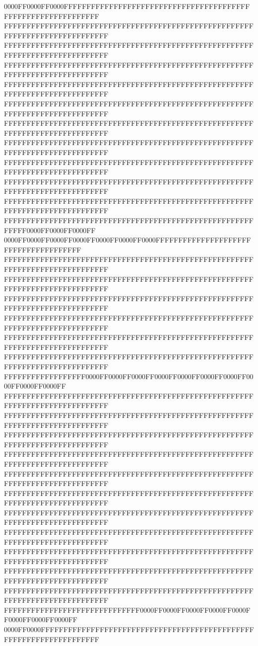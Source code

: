 0000FF0000FF0000FFFFFFFFFFFFFFFFFFFFFFFFFFFFFFFFFFFFFFFFFFFFFFFFFFFFFFFFFFFFFF
FFFFFFFFFFFFFFFFFFFFFFFFFFFFFFFFFFFFFFFFFFFFFFFFFFFFFFFFFFFFFFFFFFFFFFFFFFFFFF
FFFFFFFFFFFFFFFFFFFFFFFFFFFFFFFFFFFFFFFFFFFFFFFFFFFFFFFFFFFFFFFFFFFFFFFFFFFFFF
FFFFFFFFFFFFFFFFFFFFFFFFFFFFFFFFFFFFFFFFFFFFFFFFFFFFFFFFFFFFFFFFFFFFFFFFFFFFFF
FFFFFFFFFFFFFFFFFFFFFFFFFFFFFFFFFFFFFFFFFFFFFFFFFFFFFFFFFFFFFFFFFFFFFFFFFFFFFF
FFFFFFFFFFFFFFFFFFFFFFFFFFFFFFFFFFFFFFFFFFFFFFFFFFFFFFFFFFFFFFFFFFFFFFFFFFFFFF
FFFFFFFFFFFFFFFFFFFFFFFFFFFFFFFFFFFFFFFFFFFFFFFFFFFFFFFFFFFFFFFFFFFFFFFFFFFFFF
FFFFFFFFFFFFFFFFFFFFFFFFFFFFFFFFFFFFFFFFFFFFFFFFFFFFFFFFFFFFFFFFFFFFFFFFFFFFFF
FFFFFFFFFFFFFFFFFFFFFFFFFFFFFFFFFFFFFFFFFFFFFFFFFFFFFFFFFFFFFFFFFFFFFFFFFFFFFF
FFFFFFFFFFFFFFFFFFFFFFFFFFFFFFFFFFFFFFFFFFFFFFFFFFFFFFFFFFFFFFFFFFFFFFFFFFFFFF
FFFFFFFFFFFFFFFFFFFFFFFFFFFFFFFFFFFFFFFFFFFFFFFFFFFFFFFFFFFFFFFFFFFFFFFFFFFFFF
FFFFFFFFFFFFFFFFFFFFFFFFFFFFFFFFFFFFFFFFFFFFFFFFFFFFFFFFFFFF0000FF0000FF0000FF
0000FF0000FF0000FF0000FF0000FF0000FF0000FFFFFFFFFFFFFFFFFFFFFFFFFFFFFFFFFFFFFF
FFFFFFFFFFFFFFFFFFFFFFFFFFFFFFFFFFFFFFFFFFFFFFFFFFFFFFFFFFFFFFFFFFFFFFFFFFFFFF
FFFFFFFFFFFFFFFFFFFFFFFFFFFFFFFFFFFFFFFFFFFFFFFFFFFFFFFFFFFFFFFFFFFFFFFFFFFFFF
FFFFFFFFFFFFFFFFFFFFFFFFFFFFFFFFFFFFFFFFFFFFFFFFFFFFFFFFFFFFFFFFFFFFFFFFFFFFFF
FFFFFFFFFFFFFFFFFFFFFFFFFFFFFFFFFFFFFFFFFFFFFFFFFFFFFFFFFFFFFFFFFFFFFFFFFFFFFF
FFFFFFFFFFFFFFFFFFFFFFFFFFFFFFFFFFFFFFFFFFFFFFFFFFFFFFFFFFFFFFFFFFFFFFFFFFFFFF
FFFFFFFFFFFFFFFFFFFFFFFFFFFFFFFFFFFFFFFFFFFFFFFFFFFFFFFFFFFFFFFFFFFFFFFFFFFFFF
FFFFFFFFFFFFFFFFFF0000FF0000FF0000FF0000FF0000FF0000FF0000FF0000FF0000FF0000FF
FFFFFFFFFFFFFFFFFFFFFFFFFFFFFFFFFFFFFFFFFFFFFFFFFFFFFFFFFFFFFFFFFFFFFFFFFFFFFF
FFFFFFFFFFFFFFFFFFFFFFFFFFFFFFFFFFFFFFFFFFFFFFFFFFFFFFFFFFFFFFFFFFFFFFFFFFFFFF
FFFFFFFFFFFFFFFFFFFFFFFFFFFFFFFFFFFFFFFFFFFFFFFFFFFFFFFFFFFFFFFFFFFFFFFFFFFFFF
FFFFFFFFFFFFFFFFFFFFFFFFFFFFFFFFFFFFFFFFFFFFFFFFFFFFFFFFFFFFFFFFFFFFFFFFFFFFFF
FFFFFFFFFFFFFFFFFFFFFFFFFFFFFFFFFFFFFFFFFFFFFFFFFFFFFFFFFFFFFFFFFFFFFFFFFFFFFF
FFFFFFFFFFFFFFFFFFFFFFFFFFFFFFFFFFFFFFFFFFFFFFFFFFFFFFFFFFFFFFFFFFFFFFFFFFFFFF
FFFFFFFFFFFFFFFFFFFFFFFFFFFFFFFFFFFFFFFFFFFFFFFFFFFFFFFFFFFFFFFFFFFFFFFFFFFFFF
FFFFFFFFFFFFFFFFFFFFFFFFFFFFFFFFFFFFFFFFFFFFFFFFFFFFFFFFFFFFFFFFFFFFFFFFFFFFFF
FFFFFFFFFFFFFFFFFFFFFFFFFFFFFFFFFFFFFFFFFFFFFFFFFFFFFFFFFFFFFFFFFFFFFFFFFFFFFF
FFFFFFFFFFFFFFFFFFFFFFFFFFFFFFFFFFFFFFFFFFFFFFFFFFFFFFFFFFFFFFFFFFFFFFFFFFFFFF
FFFFFFFFFFFFFFFFFFFFFFFFFFFFFFFFFFFFFFFFFFFFFFFFFFFFFFFFFFFFFFFFFFFFFFFFFFFFFF
FFFFFFFFFFFFFFFFFFFFFFFFFFFFFF0000FF0000FF0000FF0000FF0000FF0000FF0000FF0000FF
0000FF0000FFFFFFFFFFFFFFFFFFFFFFFFFFFFFFFFFFFFFFFFFFFFFFFFFFFFFFFFFFFFFFFFFFFF
